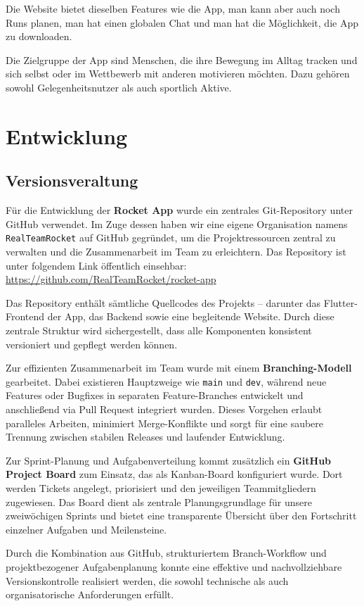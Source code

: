 \documentclass[11pt,a4paper]{article}
\begin{document}
Die Website bietet dieselben Features wie die App, man kann aber auch noch Runs planen, man hat einen globalen Chat und man hat die Möglichkeit, die App zu downloaden.

Die Zielgruppe der App sind Menschen, die ihre Bewegung im Alltag tracken und sich selbst oder im Wettbewerb mit anderen motivieren möchten. Dazu gehören sowohl Gelegenheitsnutzer als auch sportlich Aktive.

\section{Entwicklung}
\subsection{Versionsveraltung}
Für die Entwicklung der \textbf{Rocket App} wurde ein zentrales Git-Repository unter GitHub verwendet. Im Zuge dessen haben wir eine eigene Organisation namens \texttt{RealTeamRocket} auf GitHub gegründet, um die Projektressourcen zentral zu verwalten und die Zusammenarbeit im Team zu erleichtern. Das Repository ist unter folgendem Link öffentlich einsehbar:
\url{https://github.com/RealTeamRocket/rocket-app}

Das Repository enthält sämtliche Quellcodes des Projekts – darunter das Flutter-Frontend der App, das Backend sowie eine begleitende Website. Durch diese zentrale Struktur wird sichergestellt, dass alle Komponenten konsistent versioniert und gepflegt werden können.

Zur effizienten Zusammenarbeit im Team wurde mit einem \textbf{Branching-Modell} gearbeitet. Dabei existieren Hauptzweige wie \texttt{main} und \texttt{dev}, während neue Features oder Bugfixes in separaten Feature-Branches entwickelt und anschließend via Pull Request integriert wurden. Dieses Vorgehen erlaubt paralleles Arbeiten, minimiert Merge-Konflikte und sorgt für eine saubere Trennung zwischen stabilen Releases und laufender Entwicklung.

Zur Sprint-Planung und Aufgabenverteilung kommt zusätzlich ein \textbf{GitHub Project Board} zum Einsatz, das als Kanban-Board konfiguriert wurde. Dort werden Tickets angelegt, priorisiert und den jeweiligen Teammitgliedern zugewiesen. Das Board dient als zentrale Planungsgrundlage für unsere zweiwöchigen Sprints und bietet eine transparente Übersicht über den Fortschritt einzelner Aufgaben und Meilensteine.

Durch die Kombination aus GitHub, strukturiertem Branch-Workflow und projektbezogener Aufgabenplanung konnte eine effektive und nachvollziehbare Versionskontrolle realisiert werden, die sowohl technische als auch organisatorische Anforderungen erfüllt.
\end{document}
